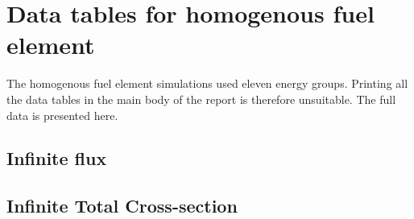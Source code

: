 
\chapter{Data tables for homogenous fuel element}
\label{chap:homog_data}

The homogenous fuel element simulations used eleven energy
groups. Printing all the data tables in the main body of the report
is therefore unsuitable. The full data is presented here.

\begin{landscape}
  \section{Infinite flux}
\label{sec:homog_inf_flx_data}

\newpage
\section{Infinite Total Cross-section}
\label{sec:homog_inf_tot_data}



\end{landscape}
